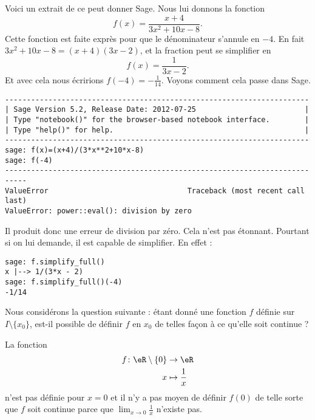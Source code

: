 Voici un extrait de ce peut donner Sage. Nous lui donnons la fonction
\begin{equation}    \label{EqyEHTBZ}
    f(x)=\frac{ x+4 }{ 3x^2+10x-8 }.
\end{equation}
Cette fonction est faite exprès pour que le dénominateur s'annule en \( -4\). En fait \( 3x^2+10x-8=(x+4)(3x-2)\), et la fraction peut se simplifier en
\begin{equation}
    f(x)=\frac{1}{ 3x-2 }.
\end{equation}
Et avec cela nous écririons \( f(-4)=-\frac{1}{ 14 }\). Voyons comment cela passe dans Sage.

\begin{verbatim}
----------------------------------------------------------------------
| Sage Version 5.2, Release Date: 2012-07-25                         |
| Type "notebook()" for the browser-based notebook interface.        |
| Type "help()" for help.                                            |
----------------------------------------------------------------------
sage: f(x)=(x+4)/(3*x**2+10*x-8)
sage: f(-4)
---------------------------------------------------------------------------
ValueError                                Traceback (most recent call last)
ValueError: power::eval(): division by zero
\end{verbatim}
Il produit donc une erreur de division par zéro. Cela n'est pas étonnant. Pourtant si on lui demande, il est capable de simplifier. En effet :
\begin{verbatim}
sage: f.simplify_full()
x |--> 1/(3*x - 2)
sage: f.simplify_full()(-4)
-1/14
\end{verbatim}

Nous considérons la question suivante : étant donné une fonction \( f\) définie sur \( I\setminus\{ x_0 \}\), est-il possible de définir \( f\) en \( x_0\) de telles façon à ce qu'elle soit continue ?

\begin{example}
    La fonction
    \begin{equation}
        \begin{aligned}
            f\colon \eR\setminus\{ 0 \}&\to \eR \\
            x&\mapsto \frac{1}{ x }
        \end{aligned}
    \end{equation}
    n'est pas définie pour \( x=0\) et il n'y a pas moyen de définir \( f(0)\) de telle sorte que \( f\) soit continue parce que \( \lim_{x\to 0} \frac{1}{ x }\) n'existe pas.
\end{example}

